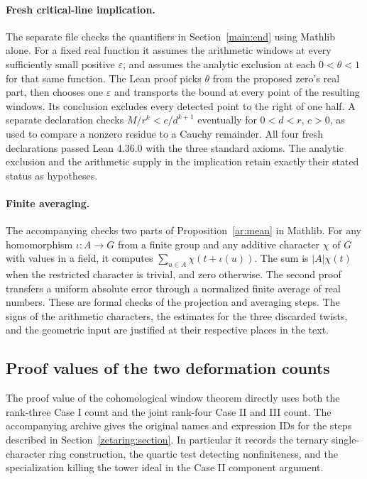 \paragraph{Fresh critical-line implication.}
The separate file  checks the quantifiers in Section~\ref{main:end} using Mathlib alone. For a fixed real function it assumes the arithmetic windows at every sufficiently small positive \(\varepsilon\), and assumes the analytic exclusion at each \(0<\theta<1\) for that same function. The Lean proof picks \(\theta\) from the proposed zero's real part, then chooses one \(\varepsilon\) and transports the bound at every point of the resulting windows. Its conclusion excludes every detected point to the right of one half. A separate declaration checks \(M/r^k<c/d^{k+1}\) eventually for \(0<d<r\), \(c>0\), as used to compare a nonzero residue to a Cauchy remainder. All four fresh declarations passed Lean 4.36.0 with the three standard axioms. The analytic exclusion and the arithmetic supply in the implication retain exactly their stated status as hypotheses.
\paragraph{Finite averaging.}
The accompanying  checks two parts
of Proposition~\ref{ar:mean} in Mathlib. For any homomorphism
\(\iota:A\to G\) from a finite group and any additive character
\(\chi\) of \(G\) with values in a field, it computes
\(\sum_{u\in A}\chi(t+\iota(u))\). The sum is
\(|A|\chi(t)\) when the restricted character is trivial, and zero otherwise.
The second proof transfers a uniform absolute error through a normalized
finite average of real numbers. These are formal checks of the
projection and averaging steps. The signs of the arithmetic characters,
the estimates for the three discarded twists, and the geometric input
are justified at their respective places in the text.
\par\endgroup

\subsection{Proof values of the two deformation counts}\label{audit:countpaths}

The proof value of the cohomological window theorem directly uses both
the rank-three Case I count and the joint rank-four Case II and III
count. The accompanying archive 
gives the original names and expression IDs for the steps described
in Section~\ref{zetaring:section}. In particular it records the
ternary single-character ring construction, the quartic test detecting
nonfiniteness, and the specialization killing the tower ideal in the
Case II component argument.

